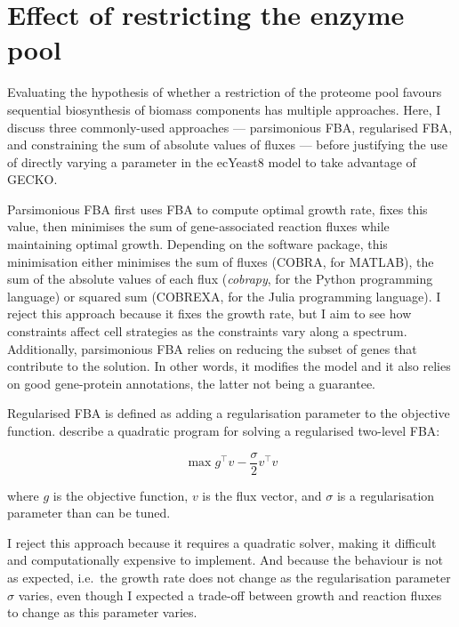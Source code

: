 \section{Effect of restricting the enzyme pool}
\label{sec:model-pool}

Evaluating the hypothesis of whether a restriction of the proteome pool favours sequential biosynthesis of biomass components has multiple approaches.
Here, I discuss three commonly-used approaches --- parsimonious FBA, regularised FBA, and constraining the sum of absolute values of fluxes --- before justifying the use of directly varying a parameter in the ecYeast8 model to take advantage of GECKO.

Parsimonious FBA \parencite{lewisOmicDataEvolved2010} first uses FBA to compute optimal growth rate, fixes this value, then minimises the sum of gene-associated reaction fluxes while maintaining optimal growth.
Depending on the software package, this minimisation either minimises the sum of fluxes (COBRA, for MATLAB), the sum of the absolute values of each flux (\textit{cobrapy}, for the Python programming language) or squared sum (COBREXA, for the Julia programming language).
I reject this approach because it fixes the growth rate, but I aim to see how constraints affect cell strategies as the constraints vary along a spectrum.
Additionally, parsimonious FBA relies on reducing the subset of genes that contribute to the solution.
In other words, it modifies the model and it also relies on good gene-protein annotations, the latter not being a guarantee.

Regularised FBA is defined as adding a regularisation parameter to the objective function.
\textcite{vijayakumarHybridFluxBalance2020} describe a quadratic program for solving a regularised two-level FBA:

\begin{equation}
  \max g^\intercal v - \frac{\sigma}{2}v^\intercal v
  \label{eq:model-regularised-fba}
\end{equation}

where $g$ is the objective function, $v$ is the flux vector, and $\sigma$ is a regularisation parameter than can be tuned.

I reject this approach because it requires a quadratic solver, making it difficult and computationally expensive to implement.
And because the behaviour is not as expected, i.e.\ the growth rate does not change as the regularisation parameter $\sigma$ varies, even though I expected a trade-off between growth and reaction fluxes to change as this parameter varies.

